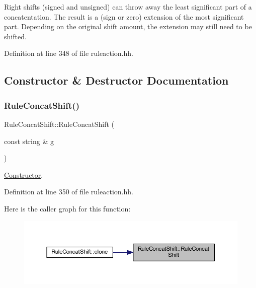 Right shifts (signed and unsigned) can throw away the least significant part of a concatentation. The result is a (sign or zero) extension of the most significant part. Depending on the original shift amount, the extension may still need to be shifted. 

Definition at line 348 of file ruleaction.\+hh.



\subsection{Constructor \& Destructor Documentation}
\mbox{\label{class_rule_concat_shift_a339294e9fbd2bbcf16cb8945f63e26cb}} 
\subsubsection{\texorpdfstring{RuleConcatShift()}{RuleConcatShift()}}
{\footnotesize\ttfamily Rule\+Concat\+Shift\+::\+Rule\+Concat\+Shift (\begin{DoxyParamCaption}\item[{const string \&}]{g }\end{DoxyParamCaption})\hspace{0.3cm}{\ttfamily [inline]}}



\mbox{\hyperlink{class_constructor}{Constructor}}. 



Definition at line 350 of file ruleaction.\+hh.

Here is the caller graph for this function\+:
\nopagebreak
\begin{figure}[H]
\begin{center}
\leavevmode
\includegraphics[width=350pt]{class_rule_concat_shift_a339294e9fbd2bbcf16cb8945f63e26cb_icgraph}
\end{center}
\end{figure}


